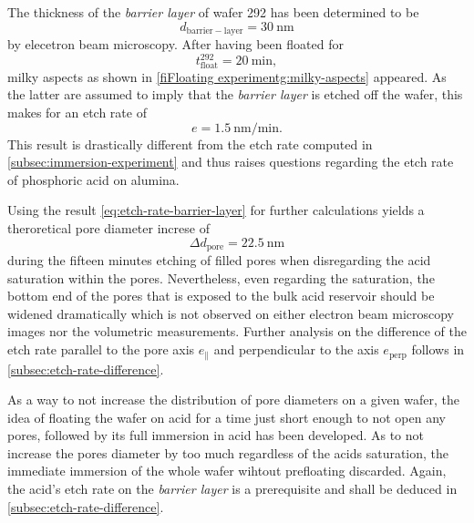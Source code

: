 \documentclass[../thesis.tex]{subfiles}
\begin{document}
            The thickness of the \textit{barrier layer} of wafer 292 has been determined to be
            \begin{equation}
              d_\mathrm{barrier-layer}=\SI{30}{\nano\meter}
            \end{equation}
            by elecetron beam microscopy. After having been floated for
            \begin{equation}
              t_\mathrm{float}^\mathrm{292}=\SI{20}{\minute},
            \end{equation}
            milky aspects as shown in \cref{fiFloating experimentg:milky-aspects} appeared. As the latter are assumed to imply that the \textit{barrier layer} is etched off the wafer, this makes for an etch rate of
            \begin{equation}
              e=\SI{1,5}{\nano\meter\per\minute}.
              \label{eq:etch-rate-barrier-layer}
            \end{equation}
            This result is drastically different from the etch rate computed in \cref{subsec:immersion-experiment} and thus raises questions regarding the etch rate of phosphoric acid on alumina.

            Using the result \cref{eq:etch-rate-barrier-layer} for further calculations yields a theroretical pore diameter increse of
            \begin{equation}
              \Delta d_\mathrm{pore}=\SI{22,5}{\nano\meter}
            \end{equation}
            during the fifteen minutes etching of filled pores when disregarding the acid saturation within the pores. Nevertheless, even regarding the saturation, the bottom end of the pores that is exposed to the bulk acid reservoir should be widened dramatically which is not observed on either electron beam microscopy images nor the volumetric measurements. Further analysis on the difference of the etch rate parallel to the pore axis $e_\mathrm{\parallel}$ and perpendicular to the axis $e_\mathrm{perp}$ follows in \cref{subsec:etch-rate-difference}.

            As a way to not increase the distribution of pore diameters on a given wafer, the idea of floating the wafer on acid for a time just short enough to not open any pores, followed by its full immersion in acid has been developed. As to not increase the pores diameter by too much regardless of the acids saturation, the immediate immersion of the whole wafer wihtout prefloating discarded. Again, the acid's etch rate on the \textit{barrier layer} is a prerequisite and shall be deduced in \cref{subsec:etch-rate-difference}.
\end{document}
